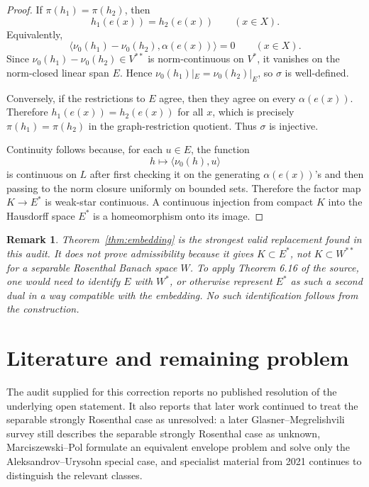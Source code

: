 \documentclass[11pt]{article}
\newtheorem{remark}[theorem]{Remark}
\begin{document}
\begin{proof}
If \(\pi(h_1)=\pi(h_2)\), then
\[
 h_1(e(x))=h_2(e(x))\qquad(x\in X).
\]
Equivalently,
\[
 \langle \nu_0(h_1)-\nu_0(h_2),\alpha(e(x))\rangle=0
 \qquad(x\in X).
\]
Since \(\nu_0(h_1)-\nu_0(h_2)\in V^{**}\) is norm-continuous on \(V^*\), it
vanishes on the norm-closed linear span \(E\).  Hence
\(\nu_0(h_1)|_E=\nu_0(h_2)|_E\), so \(\sigma\) is well-defined.

Conversely, if the restrictions to \(E\) agree, then they agree on every
\(\alpha(e(x))\).  Therefore \(h_1(e(x))=h_2(e(x))\) for all \(x\), which is
precisely \(\pi(h_1)=\pi(h_2)\) in the graph-restriction quotient.  Thus
\(\sigma\) is injective.

Continuity follows because, for each \(u\in E\), the function
\[
  h\mapsto \langle \nu_0(h),u\rangle
\]
is continuous on \(L\) after first checking it on the generating
\(\alpha(e(x))\)'s and then passing to the norm closure uniformly on bounded
sets.  Therefore the factor map \(K\to E^*\) is weak-star continuous.  A
continuous injection from compact \(K\) into the Hausdorff space \(E^*\) is a
homeomorphism onto its image.
\end{proof}

\begin{remark}
Theorem~\ref{thm:embedding} is the strongest valid replacement found in this
audit.  It does not prove admissibility because it gives \(K\subset E^*\), not
\(K\subset W^{**}\) for a separable Rosenthal Banach space \(W\).  To apply
Theorem 6.16 of the source, one would need to identify \(E\) with \(W^*\), or
otherwise represent \(E^*\) as such a second dual in a way compatible with the
embedding.  No such identification follows from the construction.
\end{remark}

\section{Literature and remaining problem}

The audit supplied for this correction reports no published resolution of the
underlying open statement.  It also reports that later work continued to treat
the separable strongly Rosenthal case as unresolved: a later
Glasner--Megrelishvili survey still describes the separable strongly Rosenthal
case as unknown, Marciszewski--Pol formulate an equivalent envelope problem
and solve only the Aleksandrov--Urysohn special case, and specialist material
from 2021 continues to distinguish the relevant classes.
\end{document}
